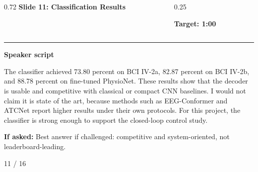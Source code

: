 \documentclass[aspectratio=169,10pt]{beamer}
\begin{document}
\begin{frame}[plain]
\vspace*{0.16cm}
\begin{columns}[T,totalwidth=\textwidth]
\begin{column}{0.72\textwidth}
{\fontsize{17}{18.5}\selectfont\bfseries Slide 11: Classification Results}
\end{column}
\begin{column}{0.25\textwidth}
\raggedleft
\colorbox{noteCream}{\parbox{0.88\linewidth}{\centering\bfseries Target: 1:00}}
\end{column}
\end{columns}
\vspace{0.10cm}
{\color{uomPurple}\rule{\textwidth}{1.2pt}}
\vspace{0.18cm}
{\color{uomPurple}\bfseries Speaker script}
\vspace{0.06cm}
\setlength{\fboxsep}{6pt}
\noindent\colorbox{panelGrey}{\begin{minipage}{0.94\textwidth}
\justifying\fontsize{11.0}{13.4}\selectfont
The classifier achieved 73.80 percent on BCI IV-2a, 82.87 percent on BCI IV-2b, and 88.78 percent on fine-tuned PhysioNet. These results show that the decoder is usable and competitive with classical or compact CNN baselines. I would not claim it is state of the art, because methods such as EEG-Conformer and ATCNet report higher results under their own protocols. For this project, the classifier is strong enough to support the closed-loop control study.
\end{minipage}}
\vspace{0.22cm}
\noindent\colorbox{noteCream}{\begin{minipage}{0.94\textwidth}
\fontsize{9.6}{11.6}\selectfont
{\bfseries If asked:} Best answer if challenged: competitive and system-oriented, not leaderboard-leading.
\end{minipage}}
\vfill
\hfill{\color{textDark}\scriptsize 11 / 16}
\end{frame}
\end{document}
